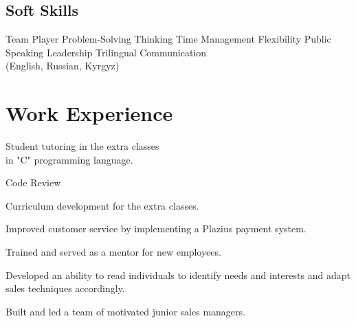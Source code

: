 \documentclass[]{deedy-resume-openfont}
\begin{document}
\begin{minipage}[t]{0.40\textwidth}
\subsection{Soft Skills}
 Team Player \textbullet{} Problem-Solving Thinking \textbullet{} Time Management \textbullet{} Flexibility \textbullet{} Public Speaking \textbullet{} Leadership \textbullet{} Trilingual Communication\\ (English, Russian, Kyrgyz)


\section{Work Experience}
\vspace{\topsep} %
\begin{tightemize}
\item Student tutoring in the extra classes\\ in "C" programming language.
\item Code Review
\item Curriculum development for the extra classes.

\end{tightemize}
\sectionsep

\begin{tightemize}
\item Improved customer service by implementing a Plazius payment system.
\item Trained and served as a mentor for new employees.
\end{tightemize}
\sectionsep


\begin{tightemize}
\item Developed an ability to read individuals to identify needs and interests and adapt sales techniques accordingly.
\item Built and led a team of motivated junior sales managers.
\end{tightemize}





%
%

\end{minipage} 
\end{document}
